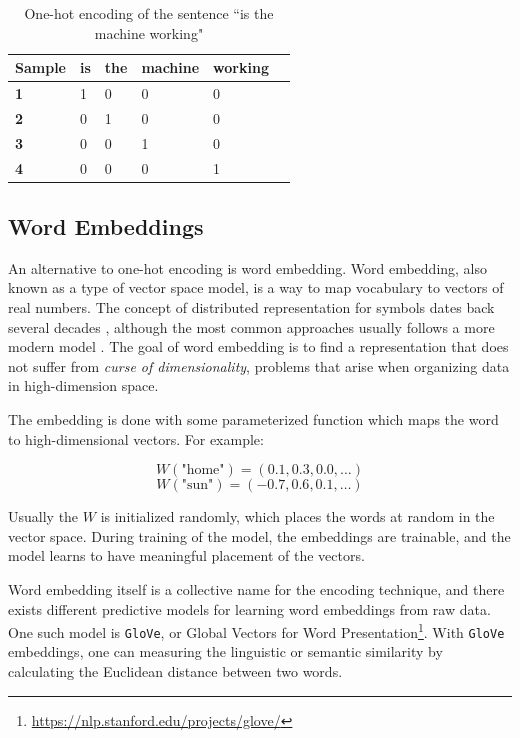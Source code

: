 \begin{table}[H]
    \centering
    \begin{tabular}{|l|l|l|l|l|l|}
        \hline
        \textbf{Sample} & \textbf{is} & \textbf{the} & \textbf{machine} & \textbf{working} \\ \hline
        \textbf{1}      & 1           & 0            & 0                & 0                \\ \hline
        \textbf{2}      & 0           & 1            & 0                & 0                \\ \hline
        \textbf{3}      & 0           & 0            & 1                & 0                \\ \hline
        \textbf{4}      & 0           & 0            & 0                & 1                \\ \hline
    \end{tabular}
    \caption{One-hot encoding of the sentence ``is the machine working"}
    \label{table:one_hot_encoding}
\end{table}

\subsection{Word Embeddings}
An alternative to one-hot encoding is word embedding. Word embedding, also known as a type of vector space model, is a way to map vocabulary to vectors of real numbers. The concept of distributed representation for symbols dates back several decades \citep{hinton1986learning}, although the most common approaches usually follows a more modern model \citep{bengio2003neural}. The goal of word embedding is to find a representation that does not suffer from \emph{curse of dimensionality}, problems that arise when organizing data in high-dimension space. 

The embedding is done with some parameterized function which maps the word to high-dimensional vectors. For example:

\begin{equation*}
    W(\text{"home"}) = (0.1, 0.3, 0.0, \ldots)
\end{equation*}
\begin{equation*}
    W(\text{"sun"}) = (-0.7, 0.6, 0.1, \ldots)
\end{equation*}

Usually the \(W\) is initialized randomly, which places the words at random in the vector space. During training of the model, the embeddings are trainable, and the model learns to have meaningful placement of the vectors.

Word embedding itself is a collective name for the encoding technique, and there exists different predictive models for learning word embeddings from raw data. One such model is {\tt GloVe}, or Global Vectors for Word Presentation\footnote{\url{https://nlp.stanford.edu/projects/glove/}}. With {\tt GloVe} embeddings, one can measuring the linguistic or semantic similarity by calculating the Euclidean distance between two words.